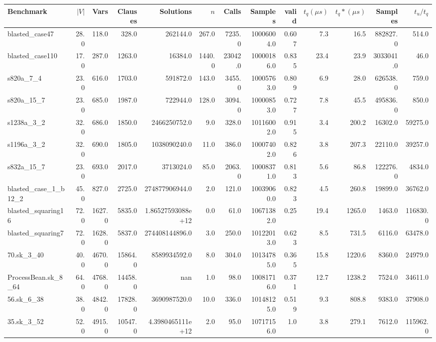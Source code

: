 \begin{tabular}{|l r r r r| r r r r r r | r r|}
\hline
Benchmark & $|V|$ & Vars & Clauses & Solutions & $n$ & Calls & Samples & valid & $t_q (\mu s)$ & $t_q* (\mu s)$ & Samples & $t_u/t_q$ \\
\hline
blasted\_case47 & 28.0 & 118.0 & 328.0 & 262144.0 & 267.0 & 7235.0 & 10006004.0 & 0.607 & 7.3 & 16.5 & 882827.0 & 514.0 \\
\hline
blasted\_case110 & 17.0 & 287.0 & 1263.0 & 16384.0 & 1440.0 & 23042.0 & 10000186.0 & 0.835 & 23.4 & 23.9 & 3033041.0 & 46.0 \\
\hline
s820a\_7\_4 & 23.0 & 616.0 & 1703.0 & 591872.0 & 143.0 & 3455.0 & 10005763.0 & 0.809 & 6.9 & 28.0 & 626538.0 & 759.0 \\
\hline
s820a\_15\_7 & 23.0 & 685.0 & 1987.0 & 722944.0 & 128.0 & 3094.0 & 10000853.0 & 0.727 & 7.8 & 45.5 & 495836.0 & 850.0 \\
\hline
s1238a\_3\_2 & 32.0 & 686.0 & 1850.0 & 2466250752.0 & 9.0 & 328.0 & 10116002.0 & 0.915 & 3.4 & 200.2 & 16302.0 & 59275.0 \\
\hline
s1196a\_3\_2 & 32.0 & 690.0 & 1805.0 & 1038090240.0 & 11.0 & 386.0 & 10007402.0 & 0.826 & 3.8 & 207.3 & 22110.0 & 39257.0 \\
\hline
s832a\_15\_7 & 23.0 & 693.0 & 2017.0 & 3713024.0 & 85.0 & 2063.0 & 10008371.0 & 0.813 & 5.6 & 86.8 & 122276.0 & 4834.0 \\
\hline
blasted\_case\_1\_b12\_2 & 45.0 & 827.0 & 2725.0 & 274877906944.0 & 2.0 & 121.0 & 10039060.0 & 0.823 & 4.5 & 260.8 & 19899.0 & 36762.0 \\
\hline
blasted\_squaring16 & 72.0 & 1627.0 & 5835.0 & 1.86527593088e+12 & 0.0 & 61.0 & 10671382.0 & 0.25 & 19.4 & 1265.0 & 1463.0 & 116830.0 \\
\hline
blasted\_squaring7 & 72.0 & 1628.0 & 5837.0 & 274408144896.0 & 3.0 & 250.0 & 10122013.0 & 0.623 & 8.5 & 731.5 & 6116.0 & 63478.0 \\
\hline
70.sk\_3\_40 & 40.0 & 4670.0 & 15864.0 & 8589934592.0 & 8.0 & 304.0 & 10134785.0 & 0.365 & 15.8 & 1220.6 & 8360.0 & 24979.0 \\
\hline
ProcessBean.sk\_8\_64 & 64.0 & 4768.0 & 14458.0 & nan & 1.0 & 98.0 & 10081716.0 & 0.371 & 12.7 & 1238.2 & 7524.0 & 34611.0 \\
\hline
56.sk\_6\_38 & 38.0 & 4842.0 & 17828.0 & 3690987520.0 & 10.0 & 336.0 & 10148125.0 & 0.519 & 9.3 & 808.8 & 9383.0 & 37908.0 \\
\hline
35.sk\_3\_52 & 52.0 & 4915.0 & 10547.0 & 4.3980465111e+12 & 2.0 & 95.0 & 10717156.0 & 1.0 & 3.8 & 279.1 & 7612.0 & 115962.0 \\

\end{tabular}
